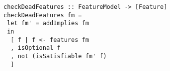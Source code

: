 \begin{lstlisting}[belowskip=12pt,frame=tb,caption={Function for checking dead features.},label=lst:dead]
checkDeadFeatures :: FeatureModel -> [Feature]
checkDeadFeatures fm = 
 let fm' = addImplies fm
 in
  [ f | f <- features fm
  , isOptional f
  , not (isSatisfiable fm' f)
  ]
\end{lstlisting} 







  



  
 


